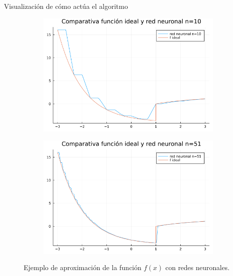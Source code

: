 \documentclass{beamer}
\begin{document}
\begin{frame}{Visualización de cómo actúa el algoritmo }
\begin{figure}[H]
\begin{subfigure}[b]{0.475\textwidth}
        \includegraphics[width=\textwidth]{7-algoritmo-inicializar-pesos/f_ideal_y_rn_con_10_neuronas.png}
    \end{subfigure}
    \hfill
    \begin{subfigure}[b]{0.475\textwidth}   
        \centering 
        \includegraphics[width=\textwidth]{7-algoritmo-inicializar-pesos/f_ideal_y_rn_con_51_neuronas.png}   
    \end{subfigure}
    \caption{Ejemplo de aproximación de la función $f(x)$ con redes neuronales.} 
    \label{fig:aproximacion-red-neuronal}
\end{figure}
\end{frame}
 
\end{document}
